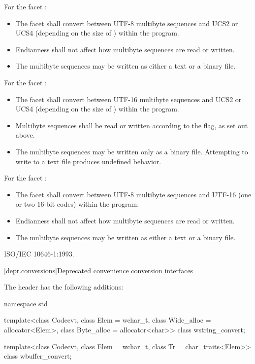\pnum
For the facet :
\begin{itemize}
\item
  The facet shall convert between UTF-8 multibyte sequences
  and UCS2 or UCS4 (depending on the size of )
  within the program.
\item
  Endianness shall not affect how multibyte sequences are read or written.
\item
  The multibyte sequences may be written as either a text or a binary file.
\end{itemize}

\pnum
For the facet :
\begin{itemize}
\item
  The facet shall convert between UTF-16 multibyte sequences
  and UCS2 or UCS4 (depending on the size of )
  within the program.
\item
  Multibyte sequences shall be read or written
  according to the  flag, as set out above.
\item
  The multibyte sequences may be written only as a binary file.
  Attempting to write to a text file produces undefined behavior.
\end{itemize}

\pnum
For the facet :
\begin{itemize}
\item
  The facet shall convert between UTF-8 multibyte sequences
  and UTF-16 (one or two 16-bit codes) within the program.
\item
  Endianness shall not affect how multibyte sequences are read or written.
\item
  The multibyte sequences may be written as either a text or a binary file.
\end{itemize}

\xref ISO/IEC 10646-1:1993.

[depr.conversions]{Deprecated convenience conversion interfaces}

\pnum
The header  has the following additions:

\begin{codeblock}
namespace std {
  template<class Codecvt, class Elem = wchar_t,
           class Wide_alloc = allocator<Elem>,
           class Byte_alloc = allocator<char>>
    class wstring_convert;

  template<class Codecvt, class Elem = wchar_t,
           class Tr = char_traits<Elem>>
    class wbuffer_convert;
}
\end{codeblock}

